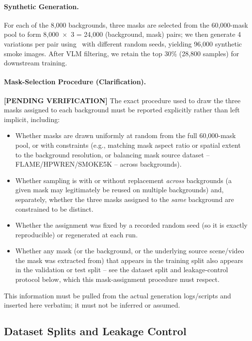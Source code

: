 \documentclass[journal]{IEEEtran}
\begin{document}
\paragraph{Synthetic Generation.}
For each of the 8,000 backgrounds, three masks are selected from the
60,000-mask pool to form 8{,}000~$\times$~3 = 24,000 (background, mask)
pairs; we then generate 4 variations per pair using \method~with different
random seeds, yielding 96,000 synthetic smoke images. After VLM filtering,
we retain the top 30\% (28,800 samples) for downstream training.

\paragraph{Mask-Selection Procedure (Clarification).}
\textbf{[PENDING VERIFICATION]} The exact procedure used to draw the three
masks assigned to each background must be reported explicitly rather than
left implicit, including:
\begin{itemize}
    \item Whether masks are drawn uniformly at random from the full
    60,000-mask pool, or with constraints (e.g., matching mask aspect ratio
    or spatial extent to the background resolution, or balancing mask
    source dataset -- FLAME/HPWREN/SMOKE5K -- across backgrounds).
    \item Whether sampling is with or without replacement \emph{across}
    backgrounds (a given mask may legitimately be reused on multiple
    backgrounds) and, separately, whether the three masks assigned to the
    \emph{same} background are constrained to be distinct.
    \item Whether the assignment was fixed by a recorded random seed (so
    it is exactly reproducible) or regenerated at each run.
    \item Whether any mask (or the background, or the underlying source
    scene/video the mask was extracted from) that appears in the training
    split also appears in the validation or test split -- see the dataset
    split and leakage-control protocol below, which this mask-assignment
    procedure must respect.
\end{itemize}
This information must be pulled from the actual generation logs/scripts and
inserted here verbatim; it must not be inferred or assumed.

\subsection{Dataset Splits and Leakage Control}
\label{sec:dataset_splits}
\end{document}
